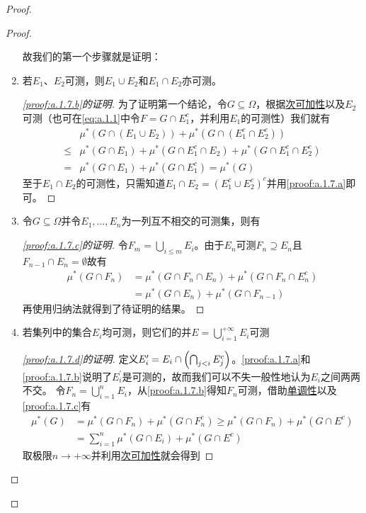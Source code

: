 \documentclass[main.tex]{subfiles}
\begin{document}
\begin{proof}
\begin{proof}
\begin{enumerate}[label=(\alph*)]
			故我们的第一个步骤就是证明：
			\item\label{proof:a.1.7.b} 若\(E_1\)、\(E_2\)可测，则\(E_1\cup E_2\)和\(E_1\cap E_2\)亦可测。
			\begin{proof}[\ref{proof:a.1.7.b}的证明]
				为了证明第一个结论，令\(G \subseteq \Omega\)，根据\hyperref[prop:a.1.subadditivity]{次可加性}以及\(E_2\)可测（也可在\eqref{eq:a.1.1}中令\(F = G\cap E_1^c\)，并利用\(E_1\)的可测性）我们就有
				\[\begin{split}
					&\mu^*(G\cap(E_1\cup E_2))+\mu^*(G\cap(E_1^c\cap E_2^c))\\
					\leq&\mu^*(G\cap E_1)+\mu^*(G\cap E_1^c\cap E_2) + \mu^*(G\cap E_1^c\cap E_2^c)\\
					=& \mu^*(G\cap E_1)+\mu^*(G\cap E_1^c) = \mu^*(G)
				\end{split}\]
				至于\(E_1\cap E_2\)的可测性，只需知道\(E_1\cap E_2 = (E_1^c\cup E_2^c)^c\)并用\ref{proof:a.1.7.a}即可。
			\end{proof}
			\item \label{proof:a.1.7.c} 令\(G\subseteq \Omega\)并令\(E_1, \dots, E_n\)为一列互不相交的可测集，则有
			\begin{proof}[\ref{proof:a.1.7.c}的证明] 令\(F_m = \bigcup_{i\leq m}E_i\)。由于\(E_n\)可测\(F_n \supseteq E_n\)且\(F_{n-1}\cap E_n = \emptyset\)故有
				\[\begin{split}
					\mu^*(G\cap F_n)&=\mu^*(G\cap F_n\cap E_n) + \mu^*(G\cap F_n\cap E_n^c)\\
					&= \mu^*(G\cap E_n)+\mu^*(G\cap F_{n-1})
				\end{split}\]
				再使用归纳法就得到了待证明的结果。
			\end{proof}
			\item \label{proof:a.1.7.d} 若集列中的集合\(E_i\)均可测，则它们的并\(E = \bigcup_{i=1}^{+\infty} E_i\)可测
			\begin{proof}[\ref{proof:a.1.7.d}的证明]
				定义\(E^\prime_i = E_i\cap\del{\bigcap_{j<i}E_j^c}\)。\ref{proof:a.1.7.a}和\ref{proof:a.1.7.b}说明了\(E^\prime_i\)是可测的，故而我们可以不失一般性地认为\(E_i\)之间两两不交。
				令\(F_n = \bigcup_{i=1}^n E_i\)，从\ref{proof:a.1.7.b}得知\(F_n\)可测，借助\hyperref[prop:a.1.monotonicity]{单调性}以及\ref{proof:a.1.7.c}有
				\[\begin{split}
					\mu^*(G) &= \mu^*(G\cap F_n)+\mu^*(G\cap F_n^c) \geq \mu^*(G\cap F_n) + \mu^*(G\cap E^c)\\
					&= \sum_{i=1}^n \mu^*(G\cap E_i) + \mu^*(G\cap E^c)
				\end{split}\]
				取极限\(n\rightarrow+\infty\)并利用\hyperref[prop:a.1.subadditivity]{次可加性}就会得到

\end{proof}
\end{enumerate}
\end{proof}
\end{proof}
\end{document}
